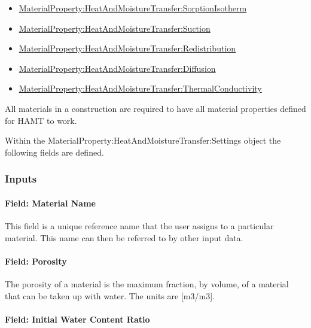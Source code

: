 \begin{itemize}
\item
  \hyperref[materialpropertyheatandmoisturetransfersorptionisotherm]{MaterialProperty:HeatAndMoistureTransfer:SorptionIsotherm}
\item
  \hyperref[materialpropertyheatandmoisturetransfersuction]{MaterialProperty:HeatAndMoistureTransfer:Suction}
\item
  \hyperref[materialpropertyheatandmoisturetransferredistribution]{MaterialProperty:HeatAndMoistureTransfer:Redistribution}
\item
  \hyperref[materialpropertyheatandmoisturetransferdiffusion]{MaterialProperty:HeatAndMoistureTransfer:Diffusion}
\item
  \hyperref[materialpropertyheatandmoisturetransferthermalconductivity]{MaterialProperty:HeatAndMoistureTransfer:ThermalConductivity}
\end{itemize}

All materials in a construction are required to have all material properties defined for HAMT to work.

Within the MaterialProperty:HeatAndMoistureTransfer:Settings object the following fields are defined.

\subsubsection{Inputs}\label{inputs-7-026}

\paragraph{Field: Material Name}\label{field-material-name-000}

This field is a unique reference name that the user assigns to a particular material. This name can then be referred to by other input data.

\paragraph{Field: Porosity}\label{field-porosity}

The porosity of a material is the maximum fraction, by volume, of a material that can be taken up with water. The units are {[}m3/m3{]}.

\paragraph{Field: Initial Water Content Ratio}\label{field-initial-water-content-ratio}

